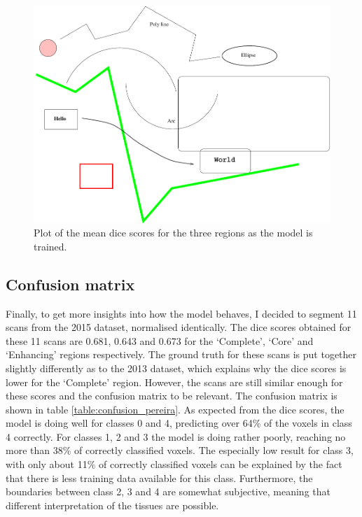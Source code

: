 \documentclass[12pt,a4paper,twoside,openright]{report}
\begin{document}
\begin{figure}
	\centering
	\label{fig:online_eval_rank}
	\includegraphics[width=\textwidth]{diagram}
	\caption{Plot of the mean dice scores for the three regions as the model is trained.}
\end{figure}


\subsection{Confusion matrix}
Finally, to get more insights into how the model behaves, I decided to segment 11 scans from the 2015 dataset, normalised identically. The dice scores obtained for these 11 scans are 0.681, 0.643 and 0.673 for the `Complete', `Core' and `Enhancing' regions respectively. The ground truth for these scans is put together slightly differently as to the 2013 dataset, which explains why the dice scores is lower for the `Complete' region. However, the scans are still similar enough for these scores and the confusion matrix to be relevant. The confusion matrix is shown in table \ref{table:confusion_pereira}. As expected from the dice scores, the model is doing well for classes 0 and 4, predicting over 64\% of the voxels in class 4 correctly. For classes 1, 2 and 3 the model is doing rather poorly, reaching no more than 38\% of correctly classified voxels. The especially low result for class 3, with only about 11\% of correctly classified voxels can be explained by the fact that there is less training data available for this class. Furthermore, the boundaries between class 2, 3 and 4 are somewhat subjective, meaning that different interpretation of the tissues are possible.
\end{document}
